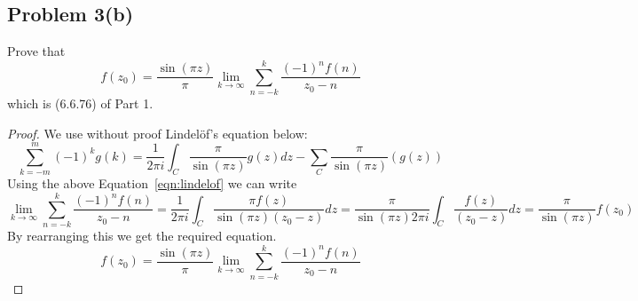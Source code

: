 \documentclass{article}[12pt]
\begin{document}
\subsection*{Problem 3(b)}Prove that
\[
f(z_0)=\frac{\sin(\pi z)}{\pi} \lim_{k\to\infty} \sum_{n=-k}^k
\frac{(-1)^nf(n)}{z_0-n}
\]
which is (6.6.76) of Part 1.
\begin{proof}
  We use without proof Lindel\"of's equation below:
  \begin{equation}
  \sum_{k=-m}^m (-1)^k g(k) = \frac{1}{2\pi i}\int_C \frac{\pi}{\sin(\pi z)} g(z)dz
  - \sum_C \frac{\pi}{\sin(\pi z)}(g(z)) \label{eqn:lindelof}
  \end{equation}
Using the above Equation~\ref{eqn:lindelof} we can write
\[
\lim_{k\to\infty} \sum_{n=-k}^k\frac{(-1)^nf(n)}{z_0-n} =
\frac{1}{2\pi i}\int_C \frac{\pi f(z)}{\sin(\pi z)(z_0-z)} dz =
\frac{\pi}{\sin(\pi z)2\pi i}\int_C \frac{f(z)}{(z_0-z)} dz = 
\frac{\pi}{\sin(\pi z)} f(z_0)
\]
By rearranging this we get the required equation.
\[
f(z_0)=\frac{\sin(\pi z)}{\pi} \lim_{k\to\infty} \sum_{n=-k}^k
\frac{(-1)^nf(n)}{z_0-n}
\]

\end{proof}
\end{document}
